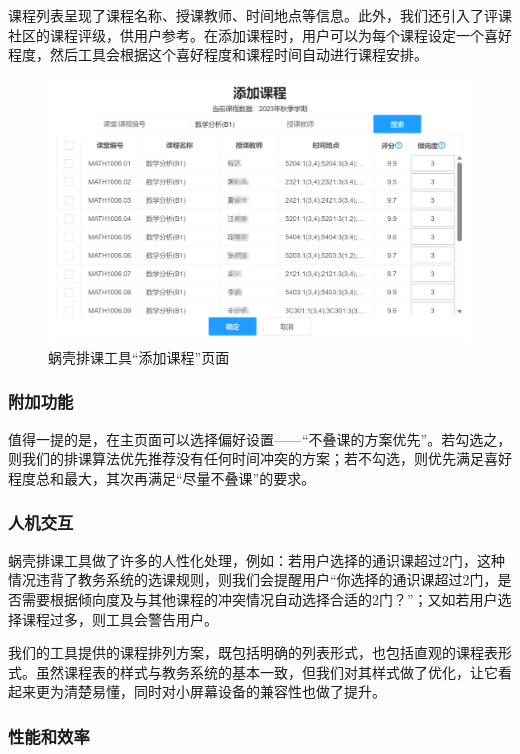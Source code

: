 课程列表呈现了课程名称、授课教师、时间地点等信息。此外，我们还引入了评课社区的课程评级，供用户参考。在添加课程时，用户可以为每个课程设定一个喜好程度，然后工具会根据这个喜好程度和课程时间自动进行课程安排。

\begin{figure}[htbp]
  \centering
  \includegraphics[width=\columnwidth]{figure/p2.png}
  \caption{蜗壳排课工具“添加课程”页面}
  \label{fig:p2}
\end{figure}

\subsubsection{附加功能}

值得一提的是，在主页面可以选择偏好设置——“不叠课的方案优先”。若勾选之，则我们的排课算法优先推荐没有任何时间冲突的方案；若不勾选，则优先满足喜好程度总和最大，其次再满足“尽量不叠课”的要求。

\subsubsection{人机交互}

蜗壳排课工具做了许多的人性化处理，例如：若用户选择的通识课超过2门，这种情况违背了教务系统的选课规则，则我们会提醒用户“你选择的通识课超过2门，是否需要根据倾向度及与其他课程的冲突情况自动选择合适的2门？”；又如若用户选择课程过多，则工具会警告用户。

我们的工具提供的课程排列方案，既包括明确的列表形式，也包括直观的课程表形式。虽然课程表的样式与教务系统的基本一致，但我们对其样式做了优化，让它看起来更为清楚易懂，同时对小屏幕设备的兼容性也做了提升。

\subsubsection{性能和效率}

